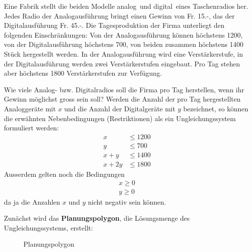 \documentclass[%
11pt,%
twoside,%
titlepage,%
german,%
headsepline%
]{scrartcl}
\begin{document}
\begin{bsp}
Eine Fabrik stellt die beiden Modelle \glqq analog\grqq\ und \glqq digital\grqq\ eines Taschenradios her. Jedes Radio der Analogausf\"uhrung bringt einen Gewinn von Fr. 15.-, das der Digitalausf\"uhrung Fr. 45.-.
Die Tagesproduktion der Firma unterliegt den folgenden Einschr\"ankungen: Von der Analogausf\"uhrung k\"onnen h\"ochstens 1200, von der Digitalausf\"uhrung h\"ochstens 700, von beiden zusammen h\"ochstens 1400 St\"uck hergestellt werden. In der Analogausf\"uhrung wird eine Verst\"arkerstufe, in der Digitalausf\"uhrung werden zwei Verst\"arkerstufen eingebaut. Pro Tag stehen aber h\"ochstens 1800 Verst\"arkerstufen zur Verf\"ugung.

Wie viele Analog- bzw. Digitalradios soll die Firma pro Tag herstellen, wenn ihr Gewinn m\"oglichst gross sein soll?
Werden die Anzahl der pro Tag hergestellten Analogger\"ate mit $x$ und die Anzahl der Digitalger\"ate mit $y$ bezeichnet, so k\"onnen die erw\"ahnten Nebenbedingungen (Restriktionen) als ein Ungleichungssystem formuliert werden:
\begin{align}
x&\leq1200\\
y&\leq700\\
x+y&\leq1400\\
x+2y&\leq1800
\end{align}
Ausserdem gelten noch die Bedingungen
\begin{align*}
x\geq0\\
y\geq0
\end{align*}
da ja die Anzahlen $x$ und $y$ nicht negativ sein k\"onnen.

Zun\"achst wird das \textbf{Planungspolygon}, die L\"osungsmenge des Ungleichungssystems, erstellt:
\begin{figure}[h!]
\begin{center}
\end{center}
\caption{Planungspolygon}
\end{figure}


\end{bsp}
\end{document}
